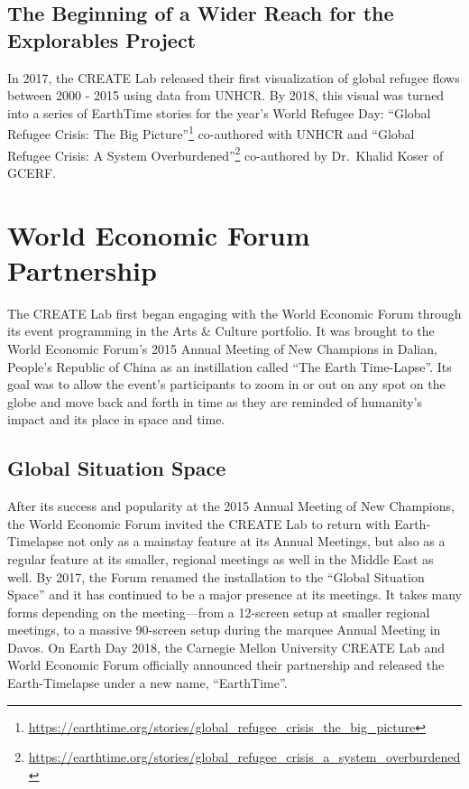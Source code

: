 \documentclass[
]{krantz}
\renewcommand{\href}[2]{#2\footnote{\url{#1}}}
\begin{document}
\hypertarget{the-beginning-of-a-wider-reach-for-the-explorables-project}{%
\subsection*{The Beginning of a Wider Reach for the Explorables Project}\label{the-beginning-of-a-wider-reach-for-the-explorables-project}}


In 2017, the CREATE Lab released their first visualization of global refugee flows between 2000 - 2015 using data from UNHCR. By 2018, this visual was turned into a series of EarthTime stories for the year's World Refugee Day: \href{https://earthtime.org/stories/global_refugee_crisis_the_big_picture}{``Global Refugee Crisis: The Big Picture''} co-authored with UNHCR and \href{https://earthtime.org/stories/global_refugee_crisis_a_system_overburdened}{``Global Refugee Crisis: A System Overburdened''} co-authored by Dr.~Khalid Koser of GCERF.

\hypertarget{world-economic-forum-partnership}{%
\section{World Economic Forum Partnership}\label{world-economic-forum-partnership}}

The CREATE Lab first began engaging with the World Economic Forum through its event programming in the Arts \& Culture portfolio. It was brought to the World Economic Forum's 2015 Annual Meeting of New Champions in Dalian, People's Republic of China as an instillation called ``The Earth Time-Lapse''. Its goal was to allow the event's participants to zoom in or out on any spot on the globe and move back and forth in time as they are reminded of humanity's impact and its place in space and time.

\hypertarget{global-situation-space}{%
\subsection*{Global Situation Space}\label{global-situation-space}}


After its success and popularity at the 2015 Annual Meeting of New Champions, the World Economic Forum invited the CREATE Lab to return with Earth-Timelapse not only as a mainstay feature at its Annual Meetings, but also as a regular feature at its smaller, regional meetings as well in the Middle East as well. By 2017, the Forum renamed the installation to the ``Global Situation Space'' and it has continued to be a major presence at its meetings. It takes many forms depending on the meeting---from a 12-screen setup at smaller regional meetings, to a massive 90-screen setup during the marquee Annual Meeting in Davos. On Earth Day 2018, the Carnegie Mellon University CREATE Lab and World Economic Forum officially announced their partnership and released the Earth-Timelapse under a new name, ``EarthTime''.
\end{document}
